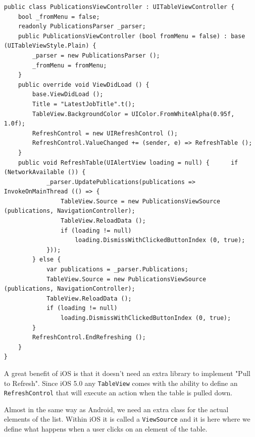\begin{lstlisting}[frame=lt,caption= PublicationsViewController.cs, label={list:ios_pub_cont}]
public class PublicationsViewController : UITableViewController	{
	bool _fromMenu = false;
	readonly PublicationsParser _parser;
	public PublicationsViewController (bool fromMenu = false) : base (UITableViewStyle.Plain) {
		_parser = new PublicationsParser ();
		_fromMenu = fromMenu;
	}
	public override void ViewDidLoad ()	{
		base.ViewDidLoad ();
		Title = "LatestJobTitle".t();
		TableView.BackgroundColor = UIColor.FromWhiteAlpha(0.95f, 1.0f);
		RefreshControl = new UIRefreshControl ();
		RefreshControl.ValueChanged += (sender, e) => RefreshTable ();
	}
	public void RefreshTable(UIAlertView loading = null) {		if (NetworkAvailable ()) {
			_parser.UpdatePublications(publications => InvokeOnMainThread (() => {
				TableView.Source = new PublicationsViewSource (publications, NavigationController);
				TableView.ReloadData ();
				if (loading != null)
					loading.DismissWithClickedButtonIndex (0, true);
			}));			
		} else {
			var publications = _parser.Publications;
			TableView.Source = new PublicationsViewSource (publications, NavigationController);
			TableView.ReloadData ();
			if (loading != null)
				loading.DismissWithClickedButtonIndex (0, true);
		}
		RefreshControl.EndRefreshing ();
	}
}
\end{lstlisting}

A great benefit of iOS is that it doesn't need an extra library to implement "Pull to Refresh". Since iOS 5.0 any \texttt{TableView} comes with the ability to define an \texttt{RefreshControl} that will execute an action when the table is pulled down.

Almost in the same way as Android, we need an extra class for the actual elements of the list. Within iOS it is called a \texttt{ViewSource} and it is here where we define what happens when a user clicks on an element of the table.

